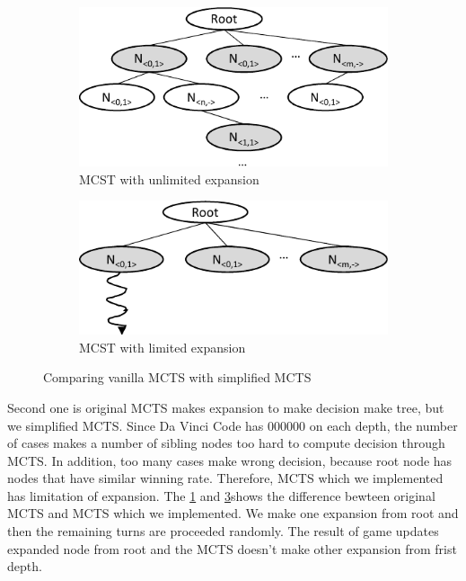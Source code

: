 \begin{figure}
\begin{subfigure}[b]{0.95\columnwidth}
\includegraphics [width=0.95\columnwidth]{figures/sub_compare_expansion_1.pdf}
\caption{MCST with unlimited expansion}
\label{fig:expansion}
\end{subfigure}
\par\bigskip
\begin{subfigure}[b]{0.95\columnwidth}
\includegraphics [width=0.95\columnwidth]{figures/sub_compare_expansion_2.pdf}
\caption{MCST with limited expansion}
\label{fig:limited_expansion}
\end{subfigure}
\caption{Comparing vanilla MCTS with simplified MCTS}
\end{figure}

Second one is original MCTS makes expansion to make decision make tree, but we simplified MCTS. 
Since Da Vinci Code has 000000 on each depth, the number of cases makes a number of sibling nodes too hard to compute decision through MCTS. 
In addition, too many cases make wrong decision, because root node has nodes that have similar winning rate. 
Therefore, MCTS which we implemented has limitation of expansion. 
The \cref{fig:expansion} and \cref{fig:limited_expansion}shows the difference bewteen original MCTS and MCTS which we implemented. 
We make one expansion from root and then the remaining turns are proceeded randomly. 
The result of game updates expanded node from root and the MCTS doesn't make other expansion from frist depth. 


